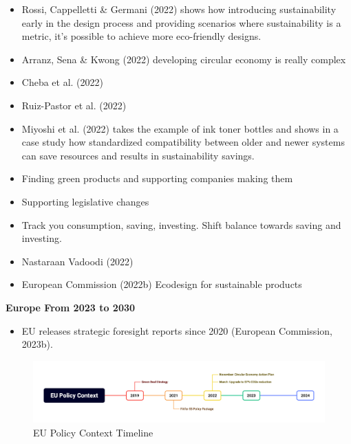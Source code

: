\documentclass[
  letterpaper,
  DIV=11,
  numbers=noendperiod]{scrartcl}
\providecommand{\tightlist}{%
  \setlength{\itemsep}{0pt}\setlength{\parskip}{0pt}}\usepackage{longtable,booktabs,array}
\begin{document}
\begin{itemize}
\item
  Rossi, Cappelletti \& Germani (2022) shows how introducing
  sustainability early in the design process and providing scenarios
  where sustainability is a metric, it's possible to achieve more
  eco-friendly designs.
\item
  Arranz, Sena \& Kwong (2022) developing circular economy is really
  complex
\item
  Cheba et al. (2022)
\item
  Ruiz-Pastor et al. (2022)
\item
  Miyoshi et al. (2022) takes the example of ink toner bottles and shows
  in a case study how standardized compatibility between older and newer
  systems can save resources and results in sustainability savings.
\item
  Finding green products and supporting companies making them
\item
  Supporting legislative changes
\item
  Track you consumption, saving, investing. Shift balance towards saving
  and investing.
\item
  Nastaraan Vadoodi (2022)
\item
  European Commission (2022b) Ecodesign for sustainable products
\end{itemize}

\textbf{Europe From 2023 to 2030}

\begin{itemize}
\tightlist
\item
  EU releases strategic foresight reports since 2020 (European
  Commission, 2023b).
\end{itemize}

\begin{figure}[H]

{\centering \includegraphics[width=1\textwidth,height=\textheight]{./images/sustainability/eu-policy-context.png}

}

\caption{EU Policy Context Timeline}

\end{figure}%
\end{document}
